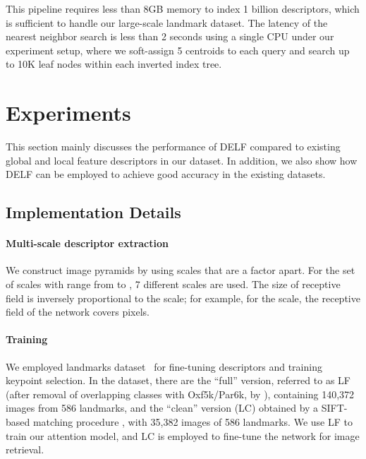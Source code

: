 \documentclass[10pt,twocolumn,letterpaper]{article}
\begin{document}
This pipeline requires less than 8GB memory to index 1 billion descriptors, which is sufficient to handle our large-scale landmark dataset.
The latency of the nearest neighbor search is less than 2 seconds using a single CPU under our experiment setup, where we soft-assign 5 centroids to each query and search up to 10K leaf nodes within each inverted index tree.





 

\section{Experiments} \label{sec:experiments}

This section mainly discusses the performance of DELF compared to existing global and local feature descriptors in our dataset.
In addition, we also show how DELF can be employed to achieve good accuracy in the existing datasets.



\subsection{Implementation Details}

\paragraph{Multi-scale descriptor extraction}
We construct image pyramids by using scales that are a  factor apart.
For the set of scales with range from  to , 7 different scales are used.
The size of receptive field is inversely proportional to the scale; for example, for the  scale, the receptive field of the network covers  pixels.



\vspace{-10pt}
\paragraph{Training}
We employed landmarks dataset~\cite{babenko2014neural} for fine-tuning descriptors and training keypoint selection.
In the dataset, there are the ``full'' version, referred to as LF (after removal of overlapping classes with Oxf5k/Par6k, by \cite{gordo2016deep}), containing 140,372 images from 586 landmarks, and the ``clean'' version (LC) obtained by a SIFT-based matching procedure \cite{gordo2016deep}, with 35,382 images of 586 landmarks.
We use LF to train our attention model, and LC is employed to fine-tune the network for image retrieval.
\end{document}
